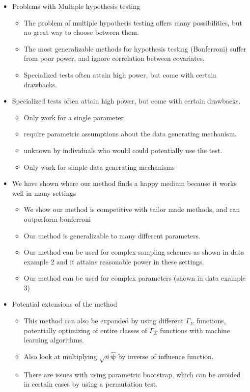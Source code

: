 \documentclass{article}
\newcommand{\Gammaf}{\Gamma_{\Sigma}}
\begin{document}
\begin{itemize}
	\item Problems with Multiple hypothesis testing
\begin{itemize}
		\item The problem of multiple hypothesis testing offers many possibilities, but no great way to choose between them. 
		\item The most generalizable methods for hypothesis testing (Bonferroni) suffer from poor power, and ignore correlation between covariates.
		\item Specialized tests often attain high power, but come with certain drawbacks.
\end{itemize}
\item Specialized tests often attain high power, but come with certain drawbacks.
\begin{itemize}
	\item Only work for a single parameter
	\item require parametric assumptions about the data generating mechanism.
	\item unknown by individuals who would could potentially use the test.
	\item Only work for simple data generating mechanisms
\end{itemize}
\item We have shown where our method finds a happy medium because it works well in many settings
\begin{itemize}
	\item We show our method is competitive with tailor made methods, and can outperform bonferroni
	\item Our method is generalizable to many different parameters.
	\item Our method can be used for complex sampling schemes as shown in data example 2 and it attains reasonable power in these settings.
	\item Our method can be used for complex parameters (shown in data example 3) 
\end{itemize}
\item Potential extensions of the method
\begin{itemize}
	\item This method can also be expanded by using different $\Gammaf$ functions, potentially optimizing of entire classes of $\Gammaf$ functions with machine learning algorithms.
	\item Also look at multiplying $\sqrt{n}\hat{\boldsymbol{\psi}}$ by inverse of influence function. 
	\item There are issues with using parametric bootstrap, which can be avoided in certain cases by using a permutation test.
\end{itemize}
\end{itemize}
\end{document}

